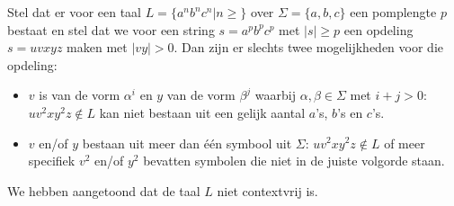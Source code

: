 Stel dat er voor een taal $L = \{a^nb^nc^n|n\geq\}$ over $\Sigma = \{a,b,c\}$ een pomplengte $p$ bestaat en stel dat we voor een string $s = a^pb^pc^p$ met $|s| \geq p$ een opdeling $s=uvxyz$ maken met $|vy| > 0$. Dan zijn er slechts twee mogelijkheden voor die opdeling:
\begin{itemize}
\item $v$ is van de vorm $\alpha^i$ en $y$ van de vorm $\beta^j$ waarbij $\alpha,\beta \in \Sigma$ met $i+j>0$: $uv^2xy^2z \notin L$ kan niet bestaan uit een gelijk aantal $a$'s, $b$'s en $c$'s.
\item $v$ en/of $y$ bestaan uit meer dan \'e\'en symbool uit $\Sigma$: $uv^2xy^2z \notin L$ of meer specifiek $v^2$ en/of $y^2$ bevatten symbolen die niet in de juiste volgorde staan.
\end{itemize}

We hebben aangetoond dat de taal $L$ niet contextvrij is.